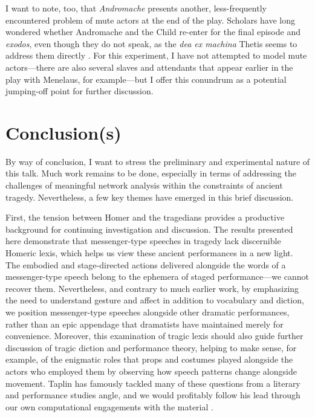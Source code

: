 \documentclass{jcls}
\begin{document}
I want to note, too, that \textit{Andromache} presents another,
less-frequently encountered problem of mute actors at the end of the
play. Scholars have long wondered whether Andromache and the Child
re-enter for the final episode and \textit{exodos}, even though they
do not speak, as the \textit{dea ex machina} Thetis seems to address
them directly \cite{Golder1983}. For this experiment, I have not
attempted to model mute actors---there are also several slaves and
attendants that appear earlier in the play with Menelaus, for
example---but I offer this conundrum as a potential jumping-off point
for further discussion.

\section{Conclusion(s)}

By way of conclusion, I want to stress the preliminary and
experimental nature of this talk. Much work remains to be done,
especially in terms of addressing the challenges of meaningful
network analysis within the constraints of ancient tragedy.
Nevertheless, a few key themes have emerged in this brief discussion.

First, the tension between Homer and the tragedians provides a
productive background for continuing investigation and discussion.
The results presented here demonstrate that messenger-type speeches
in tragedy lack discernible Homeric lexis, which helps us view these
ancient performances in a new light. The embodied and stage-directed
actions delivered alongside the words of a messenger-type speech
belong to the ephemera of staged performance---we cannot recover
them. Nevertheless, and contrary to much earlier work, by emphasizing
the need to understand gesture and affect in addition to vocabulary
and diction, we position messenger-type speeches alongside other
dramatic performances, rather than an epic appendage that dramatists
have maintained merely for convenience. Moreover, this examination of
tragic lexis should also guide further discussion of tragic diction
and performance theory, helping to make sense, for example, of the
enigmatic roles that props and costumes played alongside the actors
who employed them by observing how speech patterns change alongside
movement. Taplin has famously tackled many of these questions from a
literary and performance studies angle, and we would profitably
follow his lead through our own computational engagements with the
material \cite{Taplin1977, Taplin2003}.
\end{document}
